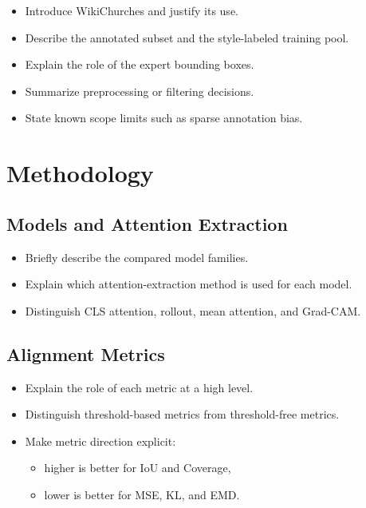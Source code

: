 \documentclass[11pt]{article}
\begin{document}
\begin{itemize}[leftmargin=1.5em]
    \item Introduce WikiChurches and justify its use.
    \item Describe the annotated subset and the style-labeled training pool.
    \item Explain the role of the expert bounding boxes.
    \item Summarize preprocessing or filtering decisions.
    \item State known scope limits such as sparse annotation bias.
\end{itemize}

\section{Methodology}

\subsection{Models and Attention Extraction}

\begin{itemize}[leftmargin=1.5em]
    \item Briefly describe the compared model families.
    \item Explain which attention-extraction method is used for each model.
    \item Distinguish CLS attention, rollout, mean attention, and Grad-CAM.
\end{itemize}

\subsection{Alignment Metrics}

\begin{itemize}[leftmargin=1.5em]
    \item Explain the role of each metric at a high level.
    \item Distinguish threshold-based metrics from threshold-free metrics.
    \item Make metric direction explicit:
    \begin{itemize}[leftmargin=1.5em]
        \item higher is better for IoU and Coverage,
        \item lower is better for MSE, KL, and EMD.
    \end{itemize}
\end{itemize}
\end{document}
